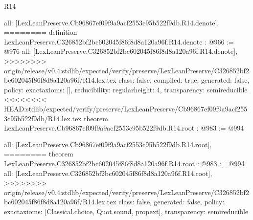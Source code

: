 \begin{lexlean}{R14}
\begin{coremodule}
{{{{{{{{{{{{  all: [LexLeanPreserve.Cb96867ef09f9a9acf2553c95b522f9db.R14.denote],
========
definition LexLeanPreserve.C326852bf2bc602045f86f8d8a120a96f.R14.denote : @966 := @976 {
  all: [LexLeanPreserve.C326852bf2bc602045f86f8d8a120a96f.R14.denote],
>>>>>>>> origin/release/v0.4:stdlib/expected/verify/preserve/LexLeanPreserve/C326852bf2bc602045f86f8d8a120a96f/R14.lex.tex
  class: false,
  compiled: true,
  generated: false,
  policy: exact{axioms: []},
  reducibility: regular{height: 4},
  transparency: semireducible
}
<<<<<<<< HEAD:stdlib/expected/verify/preserve/LexLeanPreserve/Cb96867ef09f9a9acf2553c95b522f9db/R14.lex.tex
theorem LexLeanPreserve.Cb96867ef09f9a9acf2553c95b522f9db.R14.root : @983 := @994 {
  all: [LexLeanPreserve.Cb96867ef09f9a9acf2553c95b522f9db.R14.root],
========
theorem LexLeanPreserve.C326852bf2bc602045f86f8d8a120a96f.R14.root : @983 := @994 {
  all: [LexLeanPreserve.C326852bf2bc602045f86f8d8a120a96f.R14.root],
>>>>>>>> origin/release/v0.4:stdlib/expected/verify/preserve/LexLeanPreserve/C326852bf2bc602045f86f8d8a120a96f/R14.lex.tex
  class: false,
  generated: false,
  policy: exact{axioms: [Classical.choice, Quot.sound, propext]},
  transparency: semireducible
}

}}}}}}}}}}}}}
\end{coremodule}
\end{lexlean}
